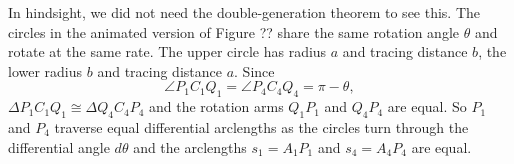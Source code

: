 \documentclass{ximera}
\begin{document}



In hindsight, we did not need the double-generation theorem to see this. The circles in the animated version of Figure ?? share the same rotation angle $\theta$ and rotate at the same rate. The upper circle has radius $a$ and tracing distance $b$, the lower radius $b$ and tracing distance $a$. Since 
\[
  \angle P_1C_1Q_1 = \angle P_4C_4Q_4 = \pi - \theta,  
\]
$\Delta P_1 C_1 Q_1\cong \Delta Q_4 C_4 P_4$ and the rotation arms $Q_1P_1$ and $Q_4P_4$ are equal. So $P_1$ and $P_4$ traverse equal differential arclengths as the circles turn through the differential angle $d\theta$ and the arclengths $s_1= A_1P_1$ and $s_4=A_4P_4$ are equal.

\end{document}
